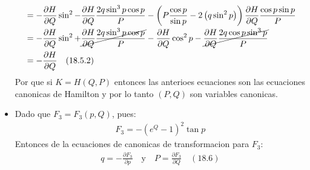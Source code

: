 \documentclass[a4paper]{article}
\begin{document}
\begin{answer}[Punto 4]
\begin{itemize}
\begin{align*}
                &= - \frac{\partial H}{\partial Q}  \sin^2 - \frac{\partial H}{\partial Q} \frac{2q \sin^3 p \cos p}{P} - \left( P \frac{\cos p}{\sin p} -2\left( q \sin^2 p \right)\right) \frac{\partial H}{\partial Q} \frac{\cos p \sin p}{P} \\
                &= - \frac{\partial H}{\partial Q}  \sin^2 + \cancel{\frac{\partial H}{\partial Q} \frac{2q \sin^3 p \cos p}{P}} - \frac{\partial H}{\partial Q}  \cos^2 p-  \cancel{\frac{\partial H}{\partial Q} \frac{2 q \cos p \sin^3 p}{P} }\\
                &= - \frac{\partial H}{\partial Q} \quad (18.5.2)\\
            \end{align*}
            Por que si $K = H(Q,P)$ entonces las anterioes ecuaciones son las ecuaciones canonicas de Hamilton y por lo tanto $(P,Q)$ son variables canonicas.

            \item  Dado que $F_3 = F_3(p,Q)$, pues:
            \begin{align*}
                F_3 =-\left(e^Q-1\right)^2 \tan p
            \end{align*}
            Entonces de la ecuaciones de canonicas de transformacion para $F_3$:
            \begin{align*}
                q = - \frac{\partial F_3}{\partial p} \quad \text{y} \quad P = \frac{\partial F_3}{\partial Q} \quad (18.6)
            \end{align*}


\end{itemize}
\end{answer}
\end{document}
